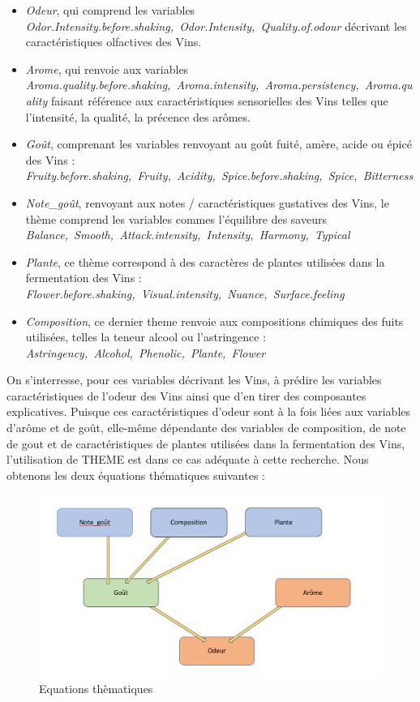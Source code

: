 \documentclass[a4paper,french,10pt]{article}
\begin{document}
\begin{itemize}
	\item \textit{Odeur}, qui comprend les variables \textit{Odor.Intensity.before.shaking,~Odor.Intensity,~Quality.of.odour} décrivant les caractéristiques olfactives des Vins. 
	\item \textit{Arome}, qui renvoie aux variables \textit{Aroma.quality.before.shaking,~Aroma.intensity,~Aroma.persistency,~Aroma.quality} faisant référence aux caractéristiques sensorielles des Vins telles que l'intensité, la qualité, la précence des arômes. 
	\item \textit{Goût}, comprenant les variables renvoyant au goût fuité, amère, acide ou épicé des Vins : \textit{Fruity.before.shaking,~Fruity,~Acidity,~Spice.before.shaking,~Spice,~Bitterness}
	\item \textit{Note\_goût}, renvoyant aux notes / caractéristiques gustatives des Vins, le thème comprend les variables commes l'équilibre des saveurs \textit{Balance,~Smooth,~Attack.intensity,~Intensity,~Harmony,~Typical}
	\item \textit{Plante}, ce thème correspond à des caractères de plantes utilisées dans la fermentation des Vins : \textit{Flower.before.shaking,~Visual.intensity,~Nuance,~Surface.feeling}
	\item \textit{Composition}, ce dernier theme renvoie aux compositions chimiques des fuits utilisées, telles la teneur alcool ou l'astringence : \textit{Astringency,~Alcohol,~Phenolic,~Plante,~Flower}
\end{itemize} 

\bigskip

On s'interresse, pour ces variables décrivant les Vins, à prédire les variables caractéristiques de l'odeur des Vins ainsi que d'en tirer des composantes explicatives. Puisque ces caractéristiques d'odeur sont à la fois liées aux variables d'arôme et de goût, elle-même dépendante des variables de composition, de note de gout et de caractéristiques de plantes utilisées dans la fermentation des Vins, l'utilisation de THEME est dans ce cas adéquate à cette recherche. Nous obtenons les deux équations thématiques suivantes : 

\begin{figure}[htp] 
	\centering
	\includegraphics[scale=0.45]{images/Eq_THEME.png}
	\caption{Equations thèmatiques}
\end{figure}
\end{document}
